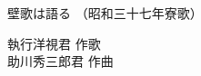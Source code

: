 \documentclass[10pt,b5j]{tarticle} %
\begin{document}
\begin{minipage}[c]{0.7\hsize} %
    \begin{center}
        {\LARGE
            壁歌は語る %
        }
        {\small 
            （昭和三十七年寮歌） %
        }
    \end{center}
\end{minipage}
\begin{minipage}[c]{0.3\hsize} %
    \begin{flushright} %
        執行洋視君 作歌\\助川秀三郎君 作曲 %
    \end{flushright}
\end{minipage}
\end{document}
